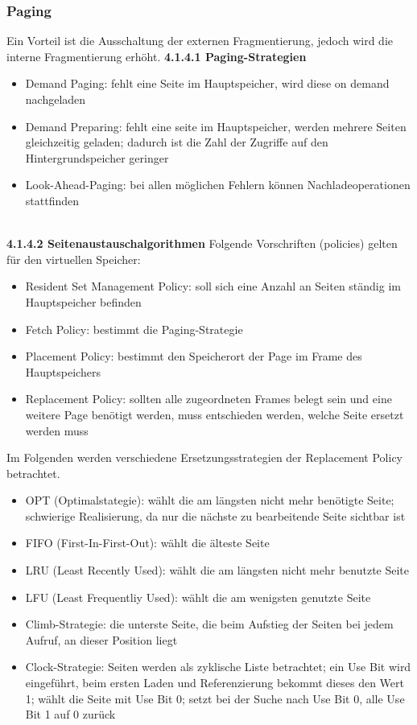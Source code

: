 \documentclass{article}
\begin{document}
\subsubsection{Paging}
    Ein Vorteil ist die Ausschaltung der externen Fragmentierung, jedoch wird die interne Fragmentierung erhöht.\newline
    \textbf{4.1.4.1 Paging-Strategien}\newline
    \begin{itemize}
        \item Demand Paging: fehlt eine Seite im Hauptspeicher, wird diese on demand nachgeladen
        \item Demand Preparing: fehlt eine seite im Hauptspeicher, werden mehrere Seiten gleichzeitig geladen; dadurch ist die Zahl der Zugriffe auf den Hintergrundspeicher geringer
        \item Look-Ahead-Paging: bei allen möglichen Fehlern können Nachladeoperationen stattfinden
    \end{itemize}\newline
    \\
    \textbf{4.1.4.2 Seitenaustauschalgorithmen}\newline
    Folgende Vorschriften (policies) gelten für den virtuellen Speicher:
    \begin{itemize}
        \item Resident Set Management Policy: soll sich eine Anzahl an Seiten ständig im Hauptspeicher befinden
        \item Fetch Policy: bestimmt die Paging-Strategie
        \item Placement Policy: bestimmt den Speicherort der Page im Frame des Hauptspeichers
        \item Replacement Policy: sollten alle zugeordneten Frames belegt sein und eine weitere Page benötigt werden, muss entschieden werden, welche Seite ersetzt werden muss
    \end{itemize}\newline
    Im Folgenden werden verschiedene Ersetzungsstrategien der Replacement Policy betrachtet.
    \begin{itemize}
        \item OPT (Optimalstategie): wählt die am längsten nicht mehr benötigte Seite; schwierige Realisierung, da nur die nächste zu bearbeitende Seite sichtbar ist
        \item FIFO (First-In-First-Out): wählt die älteste Seite
        \item LRU (Least Recently Used): wählt die am längsten nicht mehr benutzte Seite
        \item LFU (Least Frequentliy Used): wählt die am wenigsten genutzte Seite
        \item Climb-Strategie: die unterste Seite, die beim Aufstieg der Seiten bei jedem Aufruf, an dieser Position liegt
        \item Clock-Strategie: Seiten werden als zyklische Liste betrachtet; ein Use Bit wird eingeführt, beim ersten Laden und Referenzierung bekommt dieses den Wert 1; wählt die Seite mit Use Bit 0; setzt bei der Suche nach Use Bit 0, alle Use Bit 1 auf 0 zurück
    \end{itemize}\newline
\end{document}
